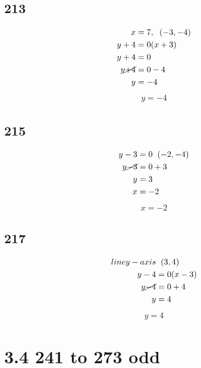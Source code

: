 \documentclass{article}
\begin{document}
    \subsection*{213}
    \begin{align*}
        x &= 7, \hspace{.2cm} (-3, -4)\\
        y + 4 &= 0(x + 3)\\
        y + 4 &= 0 \\
        y \cancel{+4} & = 0 -4\\
        y &= -4\\
    \end{align*}
    \begin{align*}
        \boxed{y = -4}
    \end{align*}

    \subsection*{215}
    \begin{align*}
        y - 3  &= 0\hspace{.2cm} (-2, -4)\\
        y \cancel{-3} &= 0 +3\\
        y &= 3 \\
        x &= -2
    \end{align*}
    \begin{align*}
        \boxed{x = -2}
    \end{align*}

    \subsection*{217}
    \begin{align*}
        line y-axis&\hspace{.2cm} (3, 4)\\
        y - 4 &= 0(x - 3)\\
        y \cancel{-4} &= 0 +4\\
        y &= 4 \\
    \end{align*}
    \begin{align*}
        \boxed{y = 4}
    \end{align*}

    \section*{3.4 241 to 273 odd}
\end{document}
